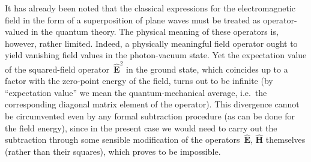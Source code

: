 It has already been noted that the classical expressions for the electromagnetic field in the form of a superposition of plane waves must be treated as operator-valued in the quantum theory. The physical meaning of these operators is, however, rather limited. Indeed, a physically meaningful field operator ought to yield vanishing field values in the photon-vacuum state. Yet the expectation value of the squared-field operator~$\hat{\mathbf{E}}^2$ in the ground state, which coincides up to a factor with the zero-point energy of the field, turns out to be infinite (by ``expectation value'' we mean the quantum-mechanical average, i.e.\ the corresponding diagonal matrix element of the operator). This divergence cannot be circumvented even by any formal subtraction procedure (as can be done for the field energy), since in the present case we would need to carry out the subtraction through some sensible modification of the operators~$\hat{\mathbf{E}}$, $\hat{\mathbf{H}}$ themselves (rather than their squares), which proves to be impossible.

